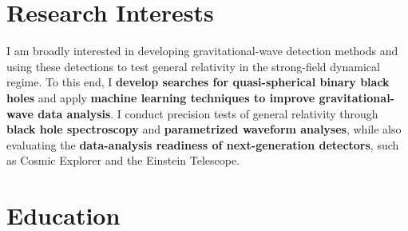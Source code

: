 
\section{Research Interests}


I am broadly interested in {developing gravitational-wave detection methods} and using these detections to {test general relativity in the strong-field dynamical regime}. To this end, I \textbf{develop searches for quasi-spherical binary black holes} and apply \textbf{machine learning techniques to improve gravitational-wave data analysis}. I conduct precision tests of general relativity through \textbf{black hole spectroscopy} and \textbf{parametrized waveform analyses}, while also evaluating the \textbf{data-analysis readiness of next-generation detectors}, such as Cosmic Explorer and the Einstein Telescope.

\section{Education}

